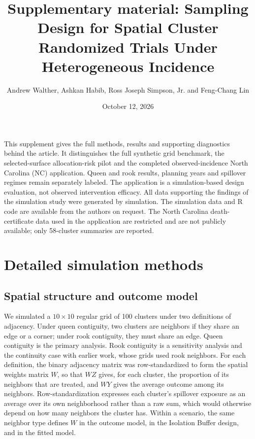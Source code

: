 \documentclass[11pt]{article}
\title{Supplementary material: Sampling Design for Spatial Cluster Randomized Trials Under Heterogeneous Incidence}
\author{Andrew Walther, Ashkan Habib, Ross Joseph Simpson, Jr. and Feng-Chang Lin}
\date{October 12, 2026}
\begin{document}
\maketitle
\noindent This supplement gives the full methods, results and supporting diagnostics behind the article. It distinguishes the full synthetic grid benchmark, the selected-surface allocation-risk pilot and the completed observed-incidence North Carolina (NC) application. Queen and rook results, planning years and spillover regimes remain separately labeled. The application is a simulation-based design evaluation, not observed intervention efficacy. All data supporting the findings of the simulation study were generated by simulation. The simulation data and R code are available from the authors on request. The North Carolina death-certificate data used in the application are restricted and are not publicly available; only 58-cluster summaries are reported.
\tableofcontents
\clearpage
\section{Detailed simulation methods}\label{detailed-simulation-methods}

\subsection{Spatial structure and outcome
model}\label{spatial-structure-and-outcome-model}

We simulated a \(10\times10\) regular grid of 100 clusters under two
definitions of adjacency. Under queen contiguity, two clusters are
neighbors if they share an edge or a corner; under rook contiguity, they
must share an edge. Queen contiguity is the primary analysis. Rook contiguity is a sensitivity analysis and the
continuity case with earlier work, whose grids used rook neighbors. For
each definition, the binary adjacency matrix was row-standardized to
form the spatial weights matrix \(W\), so that \(WZ\) gives, for each
cluster, the proportion of its neighbors that are treated, and \(WY\)
gives the average outcome among its neighbors. Row-standardization
expresses each cluster's spillover exposure as an average over its own
neighborhood rather than a raw sum, which would otherwise depend on how
many neighbors the cluster has. Within a scenario, the same neighbor
type defines \(W\) in the outcome model, in the Isolation Buffer design,
and in the fitted model.
\end{document}

